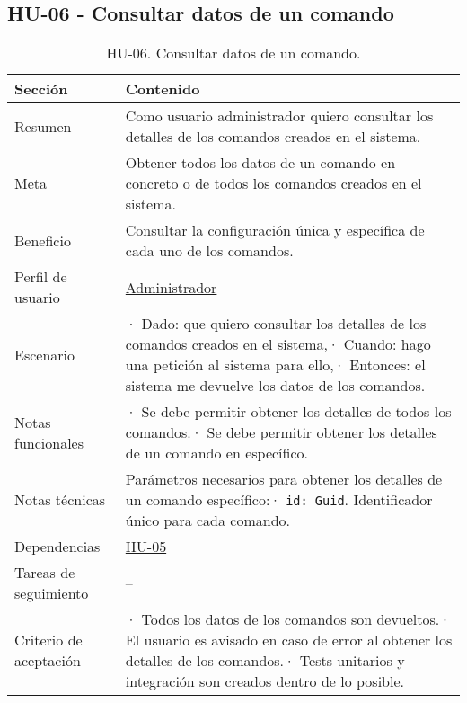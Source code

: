 \subsection{HU-06 - Consultar datos de un comando}
\label{sec:hu06}

\begin{table}[H]
    \centering
    \def\arraystretch{1.25}
    \begin{adjustbox}{max width=\textwidth}
    \begin{tabularx}{\textwidth}{|l|L|}
    \hline
        \textbf{Sección} & \textbf{Contenido} \\ \hline
    \hline
        Resumen & Como usuario administrador quiero consultar los detalles de los comandos creados en el sistema. \\ \hline
        Meta & Obtener todos los datos de un comando en concreto o de todos los comandos creados en el sistema. \\ \hline
        Beneficio & Consultar la configuración única y específica de cada uno de los comandos. \\ \hline
        Perfil de usuario & \hyperref[sec:personaAdmin]{Administrador} \\ \hline
        Escenario & · Dado: que quiero consultar los detalles de los comandos creados en el sistema,\linebreak · Cuando: hago una petición al sistema para ello,\linebreak · Entonces: el sistema me devuelve los datos de los comandos. \\ \hline
        Notas funcionales & · Se debe permitir obtener los detalles de todos los comandos.\linebreak · Se debe permitir obtener los detalles de un comando en específico. \\ \hline
        Notas técnicas & Parámetros necesarios para obtener los detalles de un comando específico:\linebreak · \verb|id: Guid|. Identificador único para cada comando. \\ \hline
        Dependencias & \hyperref[sec:hu05]{HU-05} \\ \hline
        Tareas de seguimiento & – \\ \hline
        Criterio de aceptación & · Todos los datos de los comandos son devueltos.\linebreak · El usuario es avisado en caso de error al obtener los detalles de los comandos.\linebreak · Tests unitarios y integración son creados dentro de lo posible. \\ \hline
    \end{tabularx}
    \end{adjustbox}
    \caption{HU-06. Consultar datos de un comando.}
\end{table}

